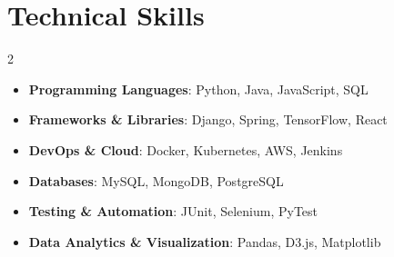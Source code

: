 \documentclass[a4paper,10pt]{article}
\begin{document}
\vspace{0.1in}

\section*{Technical Skills}

\begin{multicols}{2}
\begin{itemize}
    \item \textbf{Programming Languages}: Python, Java, JavaScript, SQL
    \item \textbf{Frameworks \& Libraries}: Django, Spring, TensorFlow, React
    \item \textbf{DevOps \& Cloud}: Docker, Kubernetes, AWS, Jenkins
    \item \textbf{Databases}: MySQL, MongoDB, PostgreSQL
    \item \textbf{Testing \& Automation}: JUnit, Selenium, PyTest
    \item \textbf{Data Analytics \& Visualization}: Pandas, D3.js, Matplotlib
\end{itemize}
\end{multicols}
\end{document}
